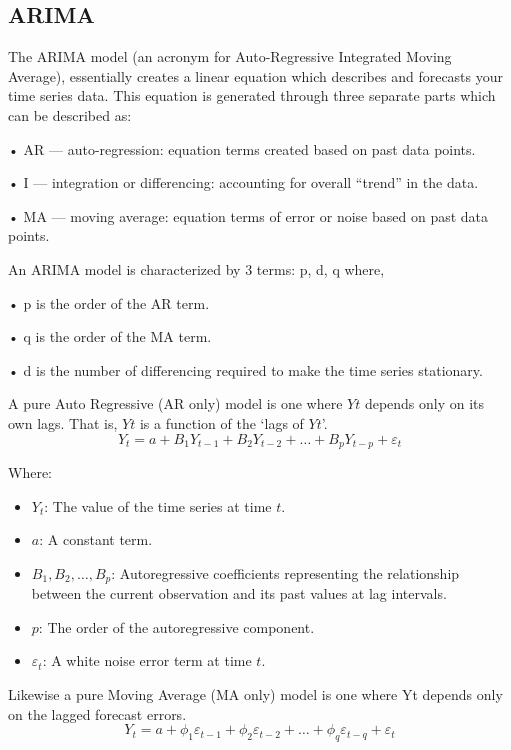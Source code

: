 \documentclass{ieeeojies}
\begin{document}
\subsection{ARIMA }
The ARIMA model (an acronym for Auto-Regressive Integrated Moving Average), essentially creates a linear equation which describes and forecasts your time series data. This equation is generated through three separate parts which can be described as:

•	AR — auto-regression: equation terms created based on past data points.

•	I — integration or differencing: accounting for overall “trend” in the data.

•	MA — moving average: equation terms of error or noise based on past data points.

An ARIMA model is characterized by 3 terms: p, d, q
where,

•	p is the order of the AR term.

•	q is the order of the MA term.

•	d is the number of differencing required to make the time series stationary.

A pure Auto Regressive (AR only) model is one where $Yt$ depends only on its own lags. That is, $Yt$ is a function of the ‘lags of $Yt$’.
\begin{equation*}
 Y_t = a + B_1 Y_{t-1} + B_2 Y_{t-2} + \ldots + B_p Y_{t-p} + \varepsilon_t
\end{equation*}

Where:

\begin{itemize}
    \item $Y_t$: The value of the time series at time $t$.
    \item $a$: A constant term.
    \item $B_1, B_2, \ldots, B_p$: Autoregressive coefficients representing the relationship between the current observation and its past values at lag intervals.
    \item $p$: The order of the autoregressive component.
    \item $\varepsilon_t$: A white noise error term at time $t$.
\end{itemize}
Likewise a pure Moving Average (MA only) model is one where Yt depends only on the lagged forecast errors.
\begin{equation*}
Y_t = a + \phi_1 \varepsilon_{t-1} + \phi_2 \varepsilon_{t-2} + \ldots + \phi_q \varepsilon_{t-q} + \varepsilon_t
\end{equation*}
\end{document}
